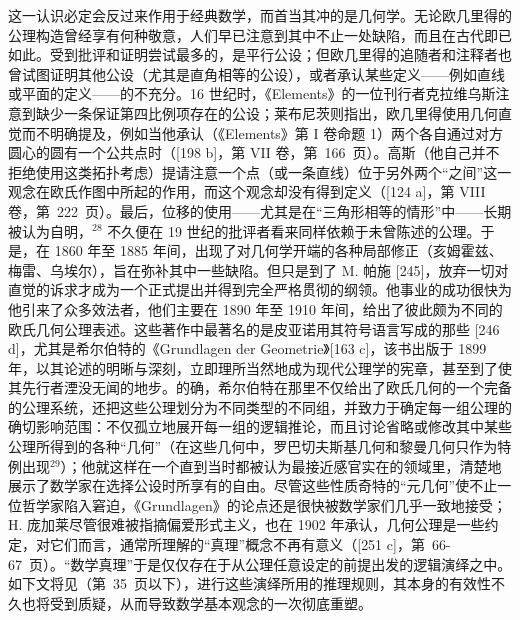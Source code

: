 这一认识必定会反过来作用于经典数学，而首当其冲的是几何学。无论欧几里得的公理构造曾经享有何种敬意，人们早已注意到其中不止一处缺陷，而且在古代即已如此。受到批评和证明尝试最多的，是平行公设；但欧几里得的追随者和注释者也曾试图证明其他公设（尤其是直角相等的公设），或者承认某些定义——例如直线或平面的定义——的不充分。16 世纪时，《Elements》的一位刊行者克拉维乌斯注意到缺少一条保证第四比例项存在的公设；莱布尼茨则指出，欧几里得使用几何直觉而不明确提及，例如当他承认（《Elements》第 I 卷命题 1）两个各自通过对方圆心的圆有一个公共点时（{[}198 b{]}，第 VII 卷，第~166~页）。高斯（他自己并不拒绝使用这类拓扑考虑）提请注意一个点（或一条直线）位于另外两个“之间”这一观念在欧氏作图中所起的作用，而这个观念却没有得到定义（{[}124 a{]}，第 VIII 卷，第~222~页）。最后，位移的使用——尤其是在“三角形相等的情形”中——长期被认为自明，\(^{28}\) 不久便在 19 世纪的批评者看来同样依赖于未曾陈述的公理。于是，在 1860 年至 1885 年间，出现了对几何学开端的各种局部修正（亥姆霍兹、梅雷、乌埃尔），旨在弥补其中一些缺陷。但只是到了 M. 帕施 {[}245{]}，放弃一切对直觉的诉求才成为一个正式提出并得到完全严格贯彻的纲领。他事业的成功很快为他引来了众多效法者，他们主要在 1890 年至 1910 年间，给出了彼此颇为不同的欧氏几何公理表述。这些著作中最著名的是皮亚诺用其符号语言写成的那些 {[}246 d{]}，尤其是希尔伯特的《Grundlagen der Geometrie》{[}163 c{]}，该书出版于 1899 年，以其论述的明晰与深刻，立即理所当然地成为现代公理学的宪章，甚至到了使其先行者湮没无闻的地步。的确，希尔伯特在那里不仅给出了欧氏几何的一个完备的公理系统，还把这些公理划分为不同类型的不同组，并致力于确定每一组公理的确切影响范围：不仅孤立地展开每一组的逻辑推论，而且讨论省略或修改其中某些公理所得到的各种“几何”（在这些几何中，罗巴切夫斯基几何和黎曼几何只作为特例出现\(^{29}\)）；他就这样在一个直到当时都被认为最接近感官实在的领域里，清楚地展示了数学家在选择公设时所享有的自由。尽管这些性质奇特的“元几何”使不止一位哲学家陷入窘迫，《Grundlagen》的论点还是很快被数学家们几乎一致地接受；H. 庞加莱尽管很难被指摘偏爱形式主义，也在 1902 年承认，几何公理是一些约定，对它们而言，通常所理解的“真理”概念不再有意义（{[}251 c{]}，第~66-67~页）。“数学真理”于是仅仅存在于从公理任意设定的前提出发的逻辑演绎之中。如下文将见（第~35~页以下），进行这些演绎所用的推理规则，其本身的有效性不久也将受到质疑，从而导致数学基本观念的一次彻底重塑。

